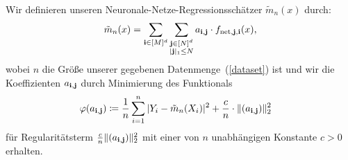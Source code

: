 Wir definieren unseren Neuronale-Netze-Regressionsschätzer $\tilde{m}_n(x)$  durch:
\begin{equation}
\label{estimate}
\tilde{m}_n(x) = \sum_{\mathbf{i} \in [M]^d} \sum_{\substack{\mathbf{j} \in [N]^d\\|\mathbf{j}|_1 \leq N}} a_{\mathbf{i},\mathbf{j}} \cdot f_{\mathrm{net},\mathbf{j},\mathbf{i}}(x),
\end{equation}
wobei $n$ die Größe unserer gegebenen Datenmenge~(\ref{dataset}) ist und wir die Koeffizienten $a_{\mathbf{i},\mathbf{j}}$ durch Minimierung des Funktionals 
\begin{equation}
\label{min} 
\begin{split}
\varphi(a_{\mathbf{i},\mathbf{j}}) & \coloneqq \frac{1}{n} \sum_{i = 1}^n|Y_i - \tilde{m}_n(X_i)|^2 + \frac{c}{n} \cdot \|(a_{\mathbf{i},\mathbf{j}})\|_2^2
\end{split}
\end{equation}
für Regularitätsterm $\frac{c}{n}\|(a_{\mathbf{i},\mathbf{j}})\|_2^2$ mit einer von $n$ unabhängigen Konstante $c > 0$ erhalten. 

